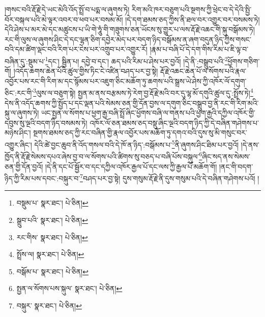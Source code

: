 །གསང་བའི་རྡོ་རྗེ་དེ་ཡང་མེའི་འོད་སྤྲོ་བ་པདྨ་ལ་ཞུགས་ཏེ། རིག་མའི་ཁར་བཅུག་པའི་སྔགས་ཀྱི་ཕྲེང་བ་དེ་དེའི་སྤྱི་བོར་བསྐལ་པའི་མེ་ལྟར་འབར་བ་ཕབ་པར་བསམ་མོ། །དེ་དག་ཐམས་ཅད་ཀྱིས་ནི་ཐལ་བར་འགྱུར་བར་བསམས་ཏེ། དེའི་ཤེས་པ་མར་མེ་དང་མཚུངས་པ་ཡི་གེ་ཧཱུཾ་གི་གཟུགས་ཅན་ཡོངས་སུ་གྱུར་པ་ལས་རྡོ་རྗེ་འཆང་གི་སྐུ་བསྒོམས་ཏེ། རང་གི་ལུས་ལ་ཞུགས་ཤིང་དེ་དང་ལྷན་ཅིག་དབྱེར་མེད་པར་བདག་ཉིད་བསྒོམས་ན་ཞག་བདུན་ཉིད་ཀྱིས་གསང་བའི་དམ་ཚིག་ལྡང་བའི་རིག་པར་ངེས་པར་འགྲུབ་པར་འགྱུར་རོ། །རྣམ་པ་བཞི་པོ་དེ་དག་གིས་རིམ་པ་ཇི་ལྟ་བ་བཞིན་དུ་:སྡུམ་པ་\footnote{བསྡུམ་པ་  སྣར་ཐང་།  པེ་ཅིན། }དང་། སྦྱིན་པ། དབྱེ་བ་དང་། ཆད་པའི་རིམ་པ་ཤེས་པར་བྱའོ། །དེ་ནི་:བསྒྲུབ་པའི་\footnote{སྒྲུབ་པའི་  སྣར་ཐང་།  པེ་ཅིན། }ཕྱོགས་གཅིག་གོ། །འདོད་ཆགས་ཆེན་པོའི་ཚུལ་གྱིས་ཏིང་ངེ་འཛིན་བཤད་པར་བྱ་སྟེ། རྡོ་རྗེ་འཆང་ཆེན་པོ་ལ་སོགས་པའི་རྣལ་འབྱོར་པས་རང་གི་རིག་མ་དང་སྙོམས་པར་འཇུག་ཅིང་མཆོག་ཏུ་ཆགས་པའི་སྒྲས་ཡེ་ཤེས་ཀྱི་འཁོར་ལོ་དགུག་ཅིང་:རང་གི་\footnote{རང་གིས་  སྣར་ཐང་།  པེ་ཅིན། }ལུས་ལ་བཅུག་སྟེ། སྤྱན་མ་ནས་བརྩམས་ཏེ་རེག་བྱ་རྡོ་རྗེ་མའི་བར་དུ་ལྷ་མོ་དགུའི་ཚུལ་དུ་:སྤྲོས་ཏེ།\footnote{སྤྲོས་ལ།  སྣར་ཐང་།  པེ་ཅིན། } དེས་ནི་འདོད་ཆགས་ཀྱི་སྤྱོད་པ་དང་ལྡན་པའི་སེམས་ཅན་གྱི་དོན་བྱས་ལ་དགུག་ཅིང་བསྒྲུབ་བྱ་ནི་རང་གི་རིག་མའི་སྐུ་ལ་ཞུགས་ཏེ། ཡང་སྤྱན་ལ་སོགས་པ་ཕྱག་རྒྱ་བཞི་སྤྲོ་ཞིང་ཕྱོགས་བཞི་ལ་གནས་པའི་ཕྱག་རྒྱའི་དཀྱིལ་འཁོར་གྱི་དབུས་སུ་ལྔའི་བདག་ཉིད་བསམས་ཏེ། འཁོར་ལོ་ཅན་ཐམས་ཅད་བསྡུ་ཞིང་ལྔའི་བདག་ཉིད་ཀྱི་དེ་བཞིན་གཤེགས་པ་མཉེས་ཤིང་། སྔགས་ཐམས་ཅད་ཀྱི་རང་བཞིན་གྱི་རྣལ་འབྱོར་པས་མཆོག་ཏུ་དགའ་བའི་དུས་སུ་མི་གསུང་བར་འགྱུར་ཞིང་། དེའི་ཚེ་བྱང་ཆུབ་ནི་འོད་གསལ་བའི་དེ་ཁོ་ན་ཉིད་:བསྒོམས་པ་\footnote{བསྒོམ་པ་  སྣར་ཐང་།  པེ་ཅིན། }ནི་ཞུགས་ཤིང་ཐིམ་པར་བྱའོ། །དེ་ནས་ཁྱོད་ནི་རྡོ་རྗེ་སེམས་དཔའ་ཞེས་བྱ་བ་ལ་སོགས་པའི་ཚིགས་སུ་བཅད་པ་བཞི་པོས་བསྐུལ་\footnote{སྤྱན་ལ་སོགས་པས་སྐུལ་  སྣར་ཐང་།  པེ་ཅིན། }ཞིང་སད་ནས་སེམས་ཅན་གྱི་དོན་བྱའོ། །དེ་ནི་དང་པོ་སྦྱོར་བ་དང་དཀྱིལ་འཁོར་རྒྱལ་པོ་དང་ལས་ཀྱི་རྒྱལ་པོ་མཆོག་གོ། །ནང་གི་བདག་ཉིད་ཀྱི་རིམ་པས་དབང་:བསྐུར་བ་\footnote{བསྐུར་  སྣར་ཐང་།  པེ་ཅིན། }བཤད་པར་བྱ་སྟེ། དུས་གསུམ་རྡོ་རྗེ་ནི་དུས་གསུམ་པའི་དེ་བཞིན་གཤེགས་པའོ། །
